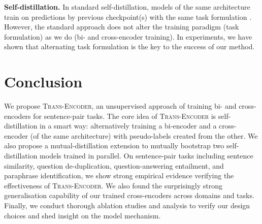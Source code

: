 \documentclass{article} \usepackage{iclr2021_conference,times}
\newcommand{\modelname}{\textsc{Trans-Encoder}\xspace}
\begin{document}
\textbf{Self-distillation.} In standard self-distillation, models of the same architecture train on predictions by previous checkpoint(s) with the same task formulation \citep{furlanello2018born,mobahi2020self}. However, the standard approach does not alter the training paradigm (task formulation) as we do (bi- and cross-encoder training). 
In experiments, we have shown that alternating task formulation is the key to the success of our method. 



\section{Conclusion}

We propose \modelname, an unsupervised approach of training bi- and cross-encoders for sentence-pair tasks. The core idea of \modelname is self-distillation in a smart way: alternatively training a bi-encoder and a cross-encoder (of the same architecture) with pseudo-labels created from the other. 
We also propose a mutual-distillation extension to mutually bootstrap two self-distillation models trained in parallel. On sentence-pair tasks including sentence similarity, question de-duplication, question-answering entailment, and paraphrase identification, we show strong empirical evidence verifying the effectiveness of \modelname. We also found the surprisingly strong generalisation capability of our trained cross-encoders across domains and tasks. Finally, we conduct thorough ablation studies and analysis to verify our design choices and shed insight on the model mechanism. 
\end{document}
